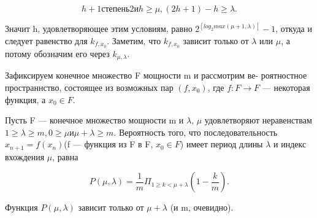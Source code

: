 $$h + 1 степень 2 и h \geqslant \mu, (2h + 1) - h \geqslant \lambda.$$ \par 
\noindent Значит h, удовлетворяющее этим условиям, равно $2^{[log_{2}max(\mu + 1,\lambda)]} - 1$, \linebreak откуда и следует равенство для $k_{f,x_{0}}$. Заметим, что $k_{f,x_{0}}$ зависит только \linebreak от $\lambda$ или $\mu$, а потому обозначим его через $k_{\mu, \lambda}$. \par 
Зафиксируем конечное множество F мощности m и рассмотрим ве- \linebreak роятностное пространнство, состоящее из возможных пар $(f, x_{0})$, где \linebreak $f: F \to F$ --- некоторая функция, а $x_{0} \in F$. \par 

\begin{lemma}
Пусть F --- конечное множество мощности m и $\lambda$, $\mu$ удовлетворяют \linebreak неравенствам $1 \geqslant \lambda \geqslant m, 0 \geqslant \mu и \mu + \lambda \geqslant m$. Вероятность того, \linebreak что последовательность $x_{n+1} = f(x_{n})$(f --- функция из F в F, $x_{0} \in F$) \linebreak имеет   период длины $\lambda$ и индекс вхождения $\mu$, равна \par 

$$P(\mu, \lambda)=\frac{1}{m} \Pi_{1\geqslant k<\mu+\lambda} (1 - \frac{k}{m}).$$ \par 
\noindent Функция $P(\mu,\lambda)$ зависит только от $\mu + \lambda$ (и m, очевидно). \end{lemma}
\newpage 

